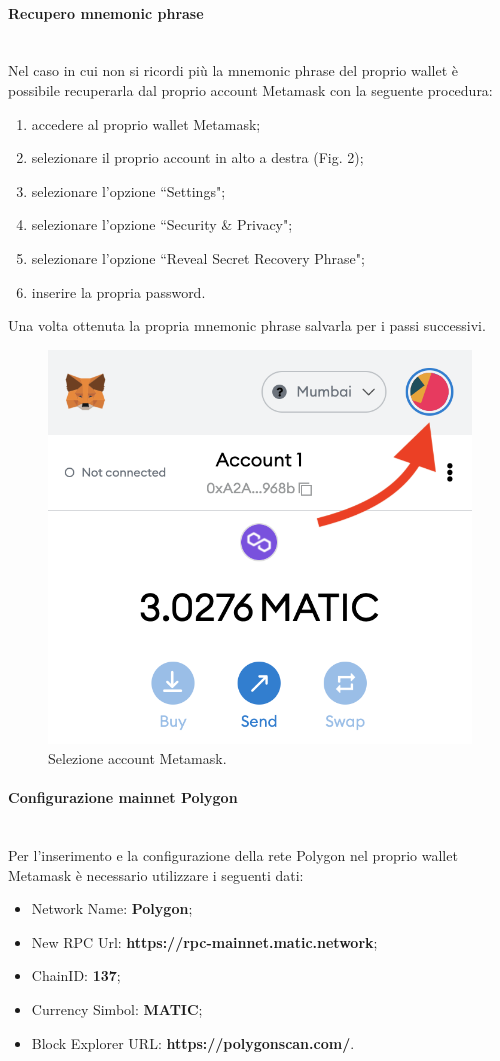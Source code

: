 \documentclass[a4paper, 12pt]{article}
\begin{document}
\paragraph{Recupero mnemonic phrase}\\
Nel caso in cui non si ricordi più la mnemonic phrase del proprio wallet è possibile recuperarla dal proprio account Metamask con la seguente procedura:
\begin{enumerate}
  \item accedere al proprio wallet Metamask;
  \item selezionare il proprio account in alto a destra (Fig. 2);
  \item selezionare l'opzione ``Settings";
  \item selezionare l'opzione ``Security \& Privacy";
  \item selezionare l'opzione ``Reveal Secret Recovery Phrase";
  \item inserire la propria password.
\end{enumerate}
Una volta ottenuta la propria mnemonic phrase salvarla per i passi successivi.
\FloatBarrier
\begin{figure}[!h]
\centering
\includegraphics[width=0.4\linewidth]{img/account_meta.png}
\caption{Selezione account Metamask.}
\end{figure}
\FloatBarrier
\paragraph{Configurazione mainnet Polygon}\\
Per l'inserimento e la configurazione della rete Polygon nel proprio wallet Metamask è necessario utilizzare i seguenti dati:
\begin{itemize}
\item Network Name: \textbf{Polygon};
\item New RPC Url: \textbf{https://rpc-mainnet.matic.network};
\item ChainID: \textbf{137};
\item Currency Simbol: \textbf{MATIC};
\item Block Explorer URL: \textbf{https://polygonscan.com/}.
\end{itemize}
\end{document}
